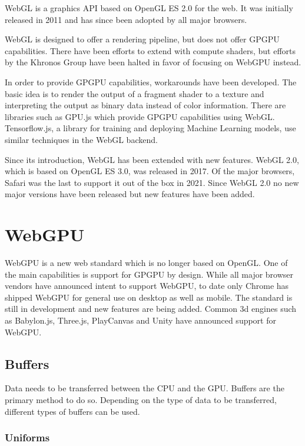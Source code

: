 WebGL is a graphics API based on OpenGL ES 2.0 for the web. It was initially released in 2011 and has since been adopted by all major browsers.

WebGL is designed to offer a rendering pipeline, but does not offer GPGPU capabilities. There have been efforts to extend with compute shaders, but efforts by the Khronos Group have been halted in favor of focusing on WebGPU instead.

In order to provide GPGPU capabilities, workarounds have been developed. The basic idea is to render the output of a fragment shader to a texture and interpreting the output as binary data instead of color information.
There are libraries such as GPU.js which provide GPGPU capabilities using WebGL. Tensorflow.js, a library for training and deploying Machine Learning models, use similar techniques in the WebGL backend.

Since its introduction, WebGL has been extended with new features. WebGL 2.0, which is based on OpenGL ES 3.0, was released in 2017. Of the major browsers, Safari was the last to support it out of the box in 2021. Since WebGL 2.0 no new major versions have been released but new features have been added.

\section{WebGPU}

WebGPU is a new web standard which is no longer based on OpenGL. One of the main capabilities is support for GPGPU by design. While all major browser vendors have announced intent to support WebGPU, to date only Chrome has shipped WebGPU for general use on desktop as well as mobile.
The standard is still in development and new features are being added.
Common 3d engines such as Babylon.js, Three.js, PlayCanvas and Unity have announced support for WebGPU.

\subsection{Buffers}

Data needs to be transferred between the CPU and the GPU. Buffers are the primary method to do so. Depending on the type of data to be transferred, different types of buffers can be used.

\subsubsection{Uniforms}


